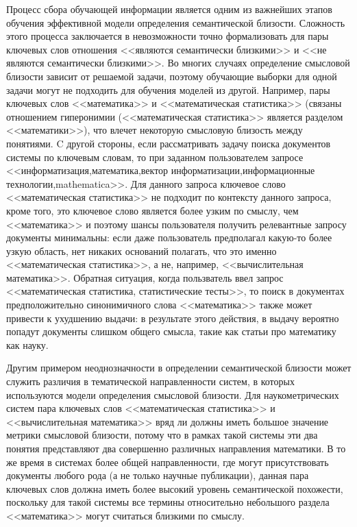 Процесс сбора обучающей информации является одним из важнейших этапов обучения эффективной модели определения семантической близости. Сложность этого процесса заключается в невозможности точно формализовать для пары ключевых слов отношения <<являются семантически близкими>> и <<не являются семантически близкими>>. Во многих случаях определение смысловой близости зависит от решаемой задачи, поэтому обучающие выборки для одной задачи могут не подходить для обучения моделей из другой. Например, пары ключевых слов <<математика>> и <<математическая статистика>> (связаны отношением гиперонимии (<<математическая статистика>> является разделом <<математики>>), что влечет некоторую смысловую близость между понятиями. C другой стороны, если рассматривать задачу поиска документов системы по ключевым словам, то при заданном пользователем запросе <<информатизация,математика,вектор информатизации,информационные технологии,mathematica>>.  Для данного запроса ключевое слово <<математическая статистика>> не подходит по контексту данного запроса, кроме того, это ключевое слово является более узким по смыслу, чем <<математика>> и поэтому шансы пользователя получить релевантные запросу документы минимальны: если даже пользователь предполагал какую-то более узкую область, нет никаких оснований полагать, что это именно <<математическая статистика>>, а не, например, <<вычислительная математика>>. Обратная ситуация, когда пользватель ввел запрос <<математическая статистика, статистические тесты>>, то поиск в документах предположительно синонимичного слова <<математика>> также может привести к ухудшению выдачи: в результате этого действия, в выдачу вероятно попадут документы слишком общего смысла, такие как статьи про математику как науку.

Другим примером неоднозначности в определении семантической близости может служить различия в тематической направленности систем, в которых используются модели определения смысловой близости. Для наукометрических систем пара ключевых слов <<математическая статистика>> и <<вычислительная математика>> вряд ли должны иметь большое значение метрики смысловой близости, потому что в рамках такой системы эти два понятия представляют два совершенно различных направления математики. В то же время в системах более общей направленности, где могут присутствовать документы любого рода (а не только научные публикации), данная пара ключевых слов должна иметь более высокий уровень семантической похожести, поскольку для такой системы все термины относительно небольшого раздела <<математика>> могут считаться близкими по смыслу.

